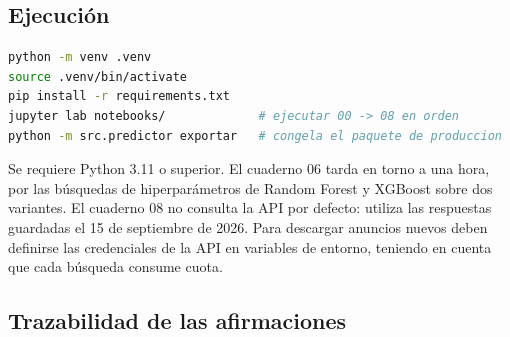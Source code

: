 \documentclass[11pt,a4paper]{article}
\newcounter{anexo}
\newcounter{anexosub}[anexo]
\begin{document}
%
\subsection*{\theanexo\hspace{0.3em}\hspace{0.45em}Ejecución}

\begin{lstlisting}[language=bash]
python -m venv .venv
source .venv/bin/activate
pip install -r requirements.txt
jupyter lab notebooks/             # ejecutar 00 -> 08 en orden
python -m src.predictor exportar   # congela el paquete de produccion
\end{lstlisting}

Se requiere Python 3.11 o superior. El cuaderno 06 tarda en torno a una hora, por las búsquedas de hiperparámetros de Random Forest y XGBoost sobre dos variantes. El cuaderno 08 no consulta la API por defecto: utiliza las respuestas guardadas el 15 de septiembre de 2026. Para descargar anuncios nuevos deben definirse las credenciales de la API en variables de entorno, teniendo en cuenta que cada búsqueda consume cuota.

%
\subsection*{\theanexo\hspace{0.3em}\hspace{0.45em}Trazabilidad de las afirmaciones}
\end{document}
